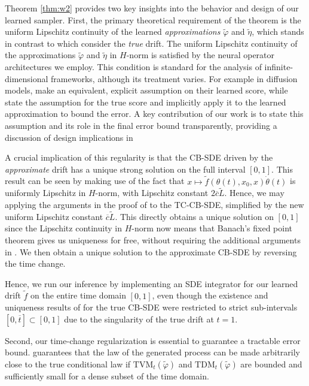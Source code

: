 Theorem \ref{thm:w2} provides two key insights into the behavior and design of our learned sampler. First, the primary theoretical requirement of the theorem is the uniform Lipschitz continuity of the  learned \textit{approximations} \(\widetilde{\varphi}\) and \(\widetilde{\eta}\), which stands in contrast to  which consider the \textit{true} drift. The uniform Lipschitz continuity of the approximations \(\widetilde{\varphi}\) and \(\widetilde{\eta}\) in \(H\)-norm is satisfied by the neural operator architectures we employ. This condition is standard for the analysis of infinite-dimensional frameworks, although its treatment varies.  For example in diffusion models, \citet{hagemann2023multilevel} make an equivalent, explicit assumption on their learned score, while \citet[Theorem 14]{pidstrigach2023infinite} state the assumption for the true score and implicitly apply it to the learned approximation to bound the error. A key contribution of our work is to state this assumption and its role in the final error bound transparently, providing a discussion of design implications in 

A crucial implication of this regularity is that the CB-SDE driven by the \textit{approximate} drift has a unique strong solution on the full interval \([0, 1]\). This result can be seen by making use of the fact that  \(x \mapsto \widetilde{f}(\theta(t), x_{0}, x)\dot{\theta}(t)\) is uniformly Lipschitz in \(H\)-norm, with Lipschitz constant \(2 \overline{c} \widetilde{L}\). Hence, we may applying the  arguments in the proof of  to the TC-CB-SDE, simplified by the new uniform Lipschitz constant \(\overline{c} \widetilde{L}\). This directly obtains a unique solution on \([0, 1]\) since the Lipschitz continuity in \(H\)-norm now means that Banach's fixed point theorem gives us uniqueness for free, without requiring the additional arguments in . We then obtain a unique solution to the approximate CB-SDE by reversing the time change. %

Hence, we run our inference by implementing an SDE integrator for our learned drift \(\widetilde{f}\) on the entire time domain \([0, 1]\), even though the existence and uniqueness results of  for the true CB-SDE were restricted to strict sub-intervals \([0, \overline{t}] \subset [0, 1]\) due to the singularity of the true drift at \(t = 1\).

Second, our time-change regularization is essential to guarantee a tractable error bound.  guarantees that the law of the generated process can be made arbitrarily close to the true conditional law if \(\mathrm{TVM}_{t}(\widetilde{\varphi})\) and \(\mathrm{TDM}_{t}(\widetilde{\varphi})\) are bounded and sufficiently small for a dense subset of the time domain.

